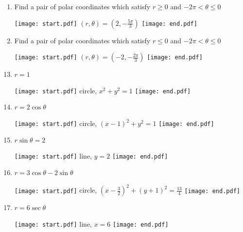 \documentclass[12pt]{article}
\begin{document}
\begin{enumerate}
\begin{enumerate}
\item Find a pair of polar coordinates which satisfy $r \geq 0$ and $-2\pi < \theta \leq 0$

\texttt{[image: start.pdf]}
{{$(r,\theta)=\left(2,-\frac{5\pi}{3}\right)$}}
\texttt{[image: end.pdf]}


\item Find a pair of polar coordinates which satisfy $r \leq 0$ and $-2\pi < \theta \leq 0$

\texttt{[image: start.pdf]}
{{$(r,\theta)=\left(-2,-\frac{2\pi}{3}\right)$}}
\texttt{[image: end.pdf]}


\end{enumerate}

\end{enumerate}


\begin{enumerate}
\setcounter{enumi}{12}

\item $r=1$ 

\texttt{[image: start.pdf]}
{{circle, $x^2+y^2=1$}}
\texttt{[image: end.pdf]}


\item $r=2\cos{\theta}$ 

\texttt{[image: start.pdf]}
{{circle, $(x-1)^2+y^2=1$}}
\texttt{[image: end.pdf]}


\item $r\sin{\theta}=2$ 

\texttt{[image: start.pdf]}
{{line, $y=2$}}
\texttt{[image: end.pdf]}


\item $r=3\cos{\theta}-2\sin{\theta}$

\texttt{[image: start.pdf]}
{{circle, $\left(x-\frac{3}{2}\right)^2+(y+1)^2=\frac{13}{4}$}}
\texttt{[image: end.pdf]}


\item $r=6\sec{\theta}$

\texttt{[image: start.pdf]}
{{line, $x=6$}}
\texttt{[image: end.pdf]}


\end{enumerate}

\end{document}

